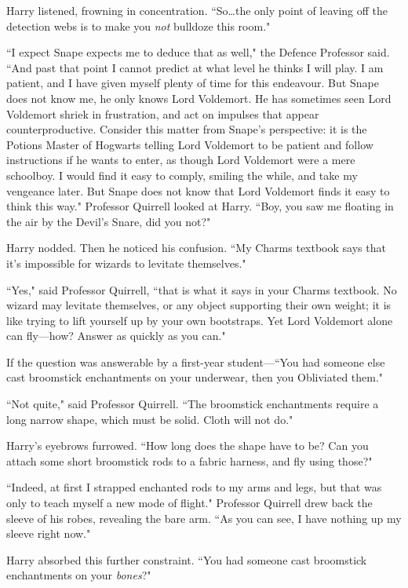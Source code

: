Harry listened, frowning in concentration. ``So…the only point of leaving off the detection webs is to make you \emph{not} bulldoze this room."

``I expect Snape expects me to deduce that as well," the Defence Professor said. ``And past that point I cannot predict at what level he thinks I will play. I am patient, and I have given myself plenty of time for this endeavour. But Snape does not know me, he only knows Lord Voldemort. He has sometimes seen Lord Voldemort shriek in frustration, and act on impulses that appear counterproductive. Consider this matter from Snape's perspective: it is the Potions Master of Hogwarts telling Lord Voldemort to be patient and follow instructions if he wants to enter, as though Lord Voldemort were a mere schoolboy. I would find it easy to comply, smiling the while, and take my vengeance later. But Snape does not know that Lord Voldemort finds it easy to think this way." Professor Quirrell looked at Harry. ``Boy, you saw me floating in the air by the Devil's Snare, did you not?"

Harry nodded. Then he noticed his confusion. ``My Charms textbook says that it's impossible for wizards to levitate themselves."

``Yes," said Professor Quirrell, ``that is what it says in your Charms textbook. No wizard may levitate themselves, or any object supporting their own weight; it is like trying to lift yourself up by your own bootstraps. Yet Lord Voldemort alone can fly—how? Answer as quickly as you can."

If the question was answerable by a first-year student—``You had someone else cast broomstick enchantments on your underwear, then you Obliviated them."

``Not quite," said Professor Quirrell. ``The broomstick enchantments require a long narrow shape, which must be solid. Cloth will not do."

Harry's eyebrows furrowed. ``How long does the shape have to be? Can you attach some short broomstick rods to a fabric harness, and fly using those?"

``Indeed, at first I strapped enchanted rods to my arms and legs, but that was only to teach myself a new mode of flight." Professor Quirrell drew back the sleeve of his robes, revealing the bare arm. ``As you can see, I have nothing up my sleeve right now."

Harry absorbed this further constraint. ``You had someone cast broomstick enchantments on your \emph{bones}?"

